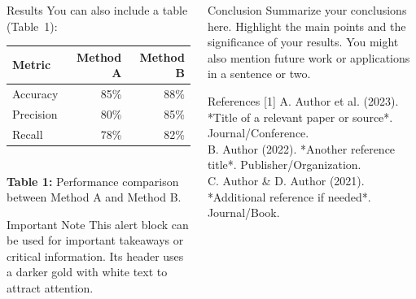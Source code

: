 \documentclass[final]{beamer}
\begin{document}
\begin{frame}[t]
\begin{columns}[t]
\begin{column}{\colwidth}
\begin{block}{Results}
        You can also include a table (Table 1):
        \begin{center}
          \begin{tabular}{lrr}
            \toprule
            \textbf{Metric} & \textbf{Method A} & \textbf{Method B}\\
            \midrule
            Accuracy  & 85\% & 88\% \\
            Precision & 80\% & 85\% \\
            Recall    & 78\% & 82\% \\
            \bottomrule
          \end{tabular}\\
          {\small \textbf{Table 1:} Performance comparison between Method A and Method B.}
        \end{center}
      \end{block}

      \begin{alertblock}{Important Note}
        This alert block can be used for important takeaways or critical information. 
        Its header uses a darker gold with white text to attract attention. 
      \end{alertblock}
    \end{column}

    \separatorcolumn

    \begin{column}{\colwidth}
      \begin{block}{Conclusion}
        Summarize your conclusions here. Highlight the main points and the significance of your results. 
        You might also mention future work or applications in a sentence or two.
      \end{block}

      \begin{block}{References}
        \small  %
        [1] A. Author et al. (2023). *Title of a relevant paper or source*. Journal/Conference.\\
        [2] B. Author (2022). *Another reference title*. Publisher/Organization.\\
        [3] C. Author & D. Author (2021). *Additional reference if needed*. Journal/Book.\\
      \end{block}
    \end{column}

  \end{columns}
\end{frame}
\end{document}

